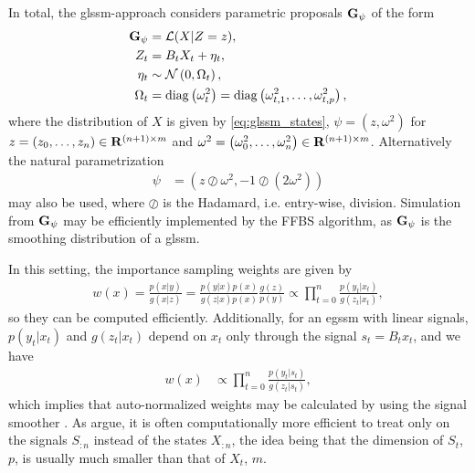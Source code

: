In total, the \gls{glssm}-approach considers parametric proposals $\mathbf G_{\psi}$ of the form
\begin{align}
    \begin{split}
    \label{eq:glssm-proposal}
    \mathbf G_{\psi} &= \mathcal L(X | Z = z),\\
    Z_{t} &= B_{t} X_{t} + \eta_{t},\\
    \eta_{t} &\sim \mathcal N \left( 0, \Omega_{t} \right),\\
    \Omega_{t} &= \operatorname{diag} \left( \omega^{2}_{t} \right) = \operatorname{diag} \left( \omega^{2}_{t,1}, \dots, \omega^{2}_{t,p} \right),
    \end{split}
\end{align}
where the distribution of $X$ is given by \eqref{eq:glssm_states}, $\psi = \left( z, \omega^{2} \right)$ for $z = \left( z_{0}, \dots, z_{n} \right) \in \mathbf R^{(n+1) \times m}$ and $\omega^{2} = \left( \omega^{2}_{0}, \dots, \omega^{2}_{n} \right) \in \mathbf R^{(n+1) \times m}$. Alternatively the natural parametrization 
\begin{align}
    \label{eq:eis_glssm_natural_parametrization}
    \psi &= \left( z \oslash \omega^{2}, - 1 \oslash \left( 2 \omega^{2} \right) \right)
\end{align}
may also be used, where $\oslash$ is the Hadamard, i.e. entry-wise, division. Simulation from $\mathbf G_{\psi}$ may be efficiently implemented by the FFBS algorithm, as $\mathbf G_{\psi}$ is the smoothing distribution of a \gls{glssm}.

In this setting, the importance sampling weights are given by 
\begin{align}
\label{eq:w-splits-by-time}
w(x) = \frac{p(x|y)}{g(x|z)} = \frac{p(y|x)p(x)}{g(z|x)p(x)} \frac{g(z)}{p(y)} \propto \prod_{t = 0}^n \frac{p(y_{t}|x_{t})}{g(z_{t}|x_{t})},
\end{align}
so they can be computed efficiently. Additionally, for an \gls{egssm} with linear signals, $p(y_{t}|x_{t})$ and $g(z_{t}|x_{t})$ depend on $x_{t}$ only through the signal $s_{t} = B_{t}x_{t}$, and we have 
\begin{align}
\label{eq:weights_only_on_signal}
w(x) &\propto \prod_{t = 0}^{n}\frac{p(y_{t}|s_{t})}{g(z_{t}|s_{t})},
\end{align}
which implies that auto-normalized weights may be calculated by using the signal smoother \citep[Theorem 2]{Jungbacker2007Monte}.
As \citep{Durbin2012Time} \citep[Section 4.5.3]{Durbin2012Time} argue, it is often computationally more efficient to treat only on the signals $S_{:n}$ instead of the states $X_{:n}$, the idea being that the dimension of $S_{t}$, $p$, is usually much smaller than that of $X_{t}$, $m$. 

